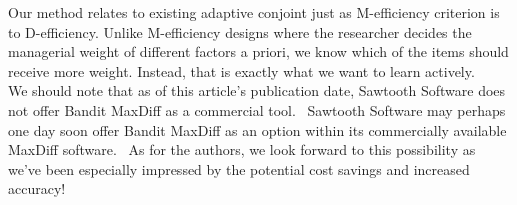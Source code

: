 \documentclass[nonblindrev]{informs3}
\begin{document}
Our method relates to existing adaptive conjoint just as M-efficiency criterion is to D-efficiency.  Unlike M-efficiency designs where the researcher decides the managerial weight of different factors a priori, we know which of the items should receive more weight. Instead, that is exactly what we want to learn actively. \\


We should note that as of this article's publication date, Sawtooth Software does not offer Bandit MaxDiff as a commercial tool.  Sawtooth Software may perhaps one day soon offer Bandit MaxDiff as an option within its commercially available MaxDiff software.  As for the authors, we look forward to this possibility as we've been especially impressed by the potential cost savings and increased accuracy!








\ACKNOWLEDGMENT{%
}%


%
%
%



\end{document}
